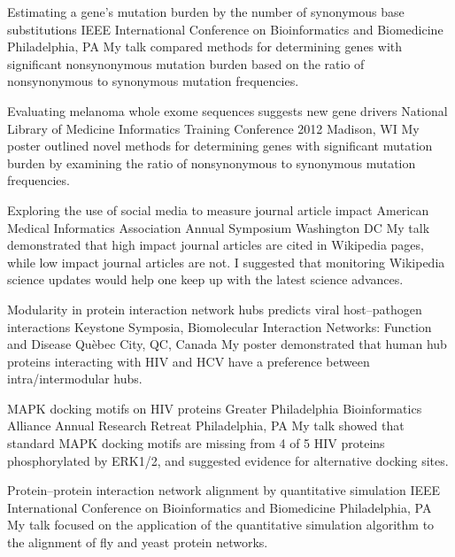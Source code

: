 \documentclass [10pt, letterpaper]{moderncv}
\begin{document}
         {Estimating a gene's mutation burden by the number of synonymous base substitutions}
         {IEEE International Conference on Bioinformatics and 
          Biomedicine}
         {Philadelphia, PA}
         {}
         {My talk compared methods for determining genes with significant nonsynonymous 
          mutation burden based on the ratio of nonsynonymous to synonymous mutation frequencies.}

         {Evaluating melanoma whole exome sequences suggests new gene drivers}
         {National Library of Medicine Informatics Training Conference 2012}
         {Madison, WI}
         {}
         {My poster outlined novel methods for determining genes with significant mutation 
          burden by examining the ratio of nonsynonymous to synonymous mutation frequencies.}

         {Exploring the use of social media to measure journal article impact}
         {American Medical Informatics Association Annual Symposium}
         {Washington DC}
         {}
         {My talk demonstrated that high impact journal articles are cited in Wikipedia pages, 
          while low impact journal articles are not. I suggested that monitoring Wikipedia science 
          updates would help one keep up with the latest science advances.}

         {Modularity in protein interaction network hubs predicts
          viral host--pathogen interactions}
         {Keystone Symposia, Biomolecular Interaction Networks: Function
          and Disease}
         {Qu\`{e}bec City, QC, Canada}
         {}
         {My poster demonstrated that human hub proteins 
          interacting with HIV and HCV
          have a preference between intra/intermodular hubs.}

         {MAPK docking motifs on HIV proteins}
         {Greater Philadelphia Bioinformatics Alliance Annual Research Retreat}
         {Philadelphia, PA}
         {}
         {My talk showed that standard MAPK docking motifs are
          missing from 4 of 5 HIV proteins phosphorylated by ERK1/2, 
          and suggested evidence
          for alternative docking sites.}

         {Protein--protein interaction network alignment by quantitative
          simulation}
         {IEEE International Conference on Bioinformatics and 
          Biomedicine}
         {Philadelphia, PA}
         {}
         {My talk focused on the application of the 
          quantitative simulation algorithm to the 
          alignment of fly and yeast
          protein networks.}
\end{document}
